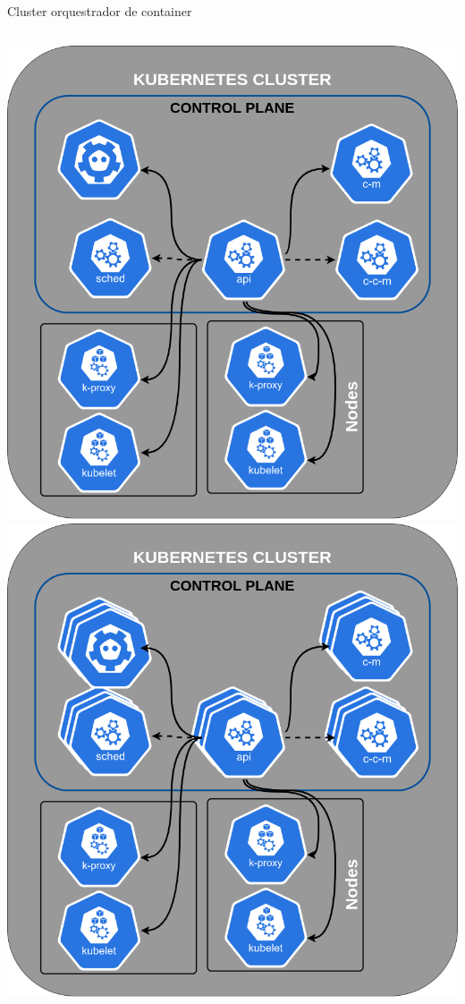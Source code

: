 \documentclass[10pt,brazil]{beamer}
\theoremstyle{definition}
\begin{document}
\begin{frame}{Cluster orquestrador de container}
\begin{columns}
\begin{column}{0.5\textwidth}
\begin{center}
\begin{overprint}
          \includegraphics[width=1\textwidth]{k8s-8.png}
          \includegraphics[width=1\textwidth]{k8s-9.png}
        \end{overprint}
      \end{center}
    \end{column}
  \end{columns}
\end{frame}
\end{document}
